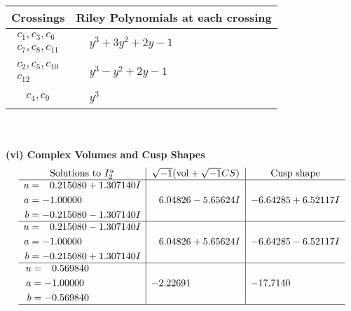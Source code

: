 \documentclass[1p]{elsarticle_modified}
\theoremstyle{definition}
\newcommand{\I}{\sqrt{-1}}
\begin{document}
\begin{tabular}{m{50pt}|m{274pt}}
Crossings & \hspace{64pt}Riley Polynomials at each crossing \\
\hline $$\begin{aligned}c_{1},c_{3},c_{6}\\c_{7},c_{8},c_{11}\end{aligned}$$&$\begin{aligned}
&y^3+3 y^2+2 y-1
\end{aligned}$\\
\hline $$\begin{aligned}c_{2},c_{5},c_{10}\\c_{12}\end{aligned}$$&$\begin{aligned}
&y^3- y^2+2 y-1
\end{aligned}$\\
\hline $$\begin{aligned}c_{4},c_{9}\end{aligned}$$&$\begin{aligned}
&y^3
\end{aligned}$\\
\hline
\end{tabular}\\~\\
\newpage\flushleft \textbf{(vi) Complex Volumes and Cusp Shapes}
$$\begin{array}{c|c|c}  
\text{Solutions to }I^u_{2}& \I (\text{vol} + \sqrt{-1}CS) & \text{Cusp shape}\\
 \hline 
\begin{aligned}
u &= \phantom{-}0.215080 + 1.307140 I \\
a &= -1.00000\phantom{ +0.000000I} \\
b &= -0.215080 - 1.307140 I\end{aligned}
 & \phantom{-}6.04826 - 5.65624 I & -6.64285 + 6.52117 I \\ \hline\begin{aligned}
u &= \phantom{-}0.215080 - 1.307140 I \\
a &= -1.00000\phantom{ +0.000000I} \\
b &= -0.215080 + 1.307140 I\end{aligned}
 & \phantom{-}6.04826 + 5.65624 I & -6.64285 - 6.52117 I \\ \hline\begin{aligned}
u &= \phantom{-}0.569840\phantom{ +0.000000I} \\
a &= -1.00000\phantom{ +0.000000I} \\
b &= -0.569840\phantom{ +0.000000I}\end{aligned}
 & -2.22691\phantom{ +0.000000I} & -17.7140\phantom{ +0.000000I}\\
 \hline 
 \end{array}$$\newpage\newpage\renewcommand{\arraystretch}{1}
\end{document}
